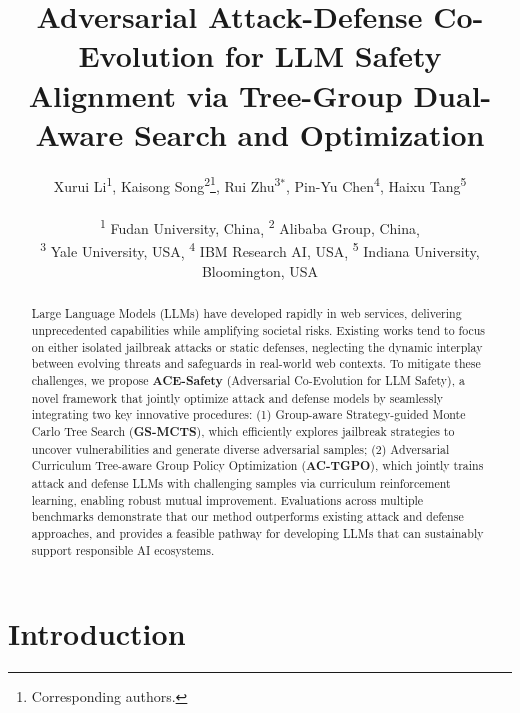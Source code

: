 \documentclass[11pt]{article}
\title{Adversarial Attack-Defense Co-Evolution for LLM Safety Alignment via Tree-Group Dual-Aware Search and Optimization}
\author{Xurui Li\textsuperscript{\rm 1}, Kaisong Song\textsuperscript{\rm 2}\thanks{ \quad Corresponding authors.}, Rui Zhu\textsuperscript{\rm 3}$^{*}$, Pin-Yu Chen\textsuperscript{\rm 4}, Haixu Tang\textsuperscript{\rm 5}\\
\\ \footnotesize{\textsuperscript{\rm 1} Fudan University, China}, \footnotesize{\textsuperscript{\rm 2} Alibaba Group, China}, \\ \footnotesize{\textsuperscript{\rm 3} Yale University, USA}, \footnotesize{\textsuperscript{\rm 4} IBM Research AI, USA}, \footnotesize{\textsuperscript{\rm 5} Indiana University, Bloomington, USA} \\
}
\def\framework{ACE-Safety}
\def\attackmethod{GS-MCTS}
\def\trainingmethod{AC-TGPO}
\begin{document}
\maketitle
\begin{abstract}
Large Language Models (LLMs) have developed rapidly in web services, delivering unprecedented capabilities while amplifying societal risks. Existing works tend to focus on either isolated jailbreak attacks or static defenses, neglecting the dynamic interplay between evolving threats and safeguards in real-world web contexts. To mitigate these challenges, we propose \textbf{{\framework}} (Adversarial Co-Evolution for LLM Safety), a novel framework that jointly optimize attack and defense models by seamlessly integrating two key innovative procedures: (1) Group-aware Strategy-guided Monte Carlo Tree Search (\textbf{{\attackmethod}}), which efficiently explores jailbreak strategies to uncover vulnerabilities and generate diverse adversarial samples; (2) Adversarial Curriculum Tree-aware Group Policy Optimization (\textbf{{\trainingmethod}}), which jointly trains attack and defense LLMs with challenging samples via curriculum reinforcement learning, enabling robust mutual improvement. Evaluations across multiple benchmarks demonstrate that our method outperforms existing attack and defense approaches, and provides a feasible pathway for developing LLMs that can sustainably support responsible AI ecosystems.
\end{abstract}

\section{Introduction}
\end{document}
